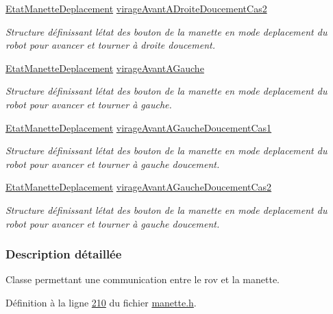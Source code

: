 \begin{DoxyCompactItemize}
\hyperlink{struct_etat_manette_deplacement}{Etat\+Manette\+Deplacement} \hyperlink{class_manette_a6b8d8fd853462fa182a37122b692db90}{virage\+Avant\+A\+Droite\+Doucement\+Cas2}
\begin{DoxyCompactList}\small\item\em Structure définissant l\textquotesingle{}état des bouton de la manette en mode deplacement du robot pour avancer et tourner à droite doucement. \end{DoxyCompactList}\item 
\hyperlink{struct_etat_manette_deplacement}{Etat\+Manette\+Deplacement} \hyperlink{class_manette_a3f44a6304ed3b17176636bad8f2220db}{virage\+Avant\+A\+Gauche}
\begin{DoxyCompactList}\small\item\em Structure définissant l\textquotesingle{}état des bouton de la manette en mode deplacement du robot pour avancer et tourner à gauche. \end{DoxyCompactList}\item 
\hyperlink{struct_etat_manette_deplacement}{Etat\+Manette\+Deplacement} \hyperlink{class_manette_a0fe6d52d8ca1060a2a3c534847824c09}{virage\+Avant\+A\+Gauche\+Doucement\+Cas1}
\begin{DoxyCompactList}\small\item\em Structure définissant l\textquotesingle{}état des bouton de la manette en mode deplacement du robot pour avancer et tourner à gauche doucement. \end{DoxyCompactList}\item 
\hyperlink{struct_etat_manette_deplacement}{Etat\+Manette\+Deplacement} \hyperlink{class_manette_a575018c439de0fd1e8cf7be5907ca60d}{virage\+Avant\+A\+Gauche\+Doucement\+Cas2}
\begin{DoxyCompactList}\small\item\em Structure définissant l\textquotesingle{}état des bouton de la manette en mode deplacement du robot pour avancer et tourner à gauche doucement. \end{DoxyCompactList}\end{DoxyCompactItemize}


\subsubsection{Description détaillée}
Classe permettant une communication entre le rov et la manette. 

Définition à la ligne \hyperlink{manette_8h_source_l00210}{210} du fichier \hyperlink{manette_8h_source}{manette.\+h}.



